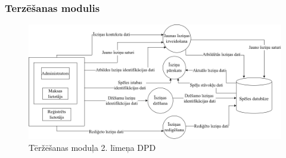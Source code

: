 \subsubsection{Terzēšanas modulis}

\begin{figure}[htbp]
	\centering
	\includegraphics[width=\linewidth]{./src/img/TerzēšanasModulis.png}
	\caption{Tēržēšanas moduļa 2. līmeņa DPD}
	\label{fig:dpd-2-chat}
\end{figure}






